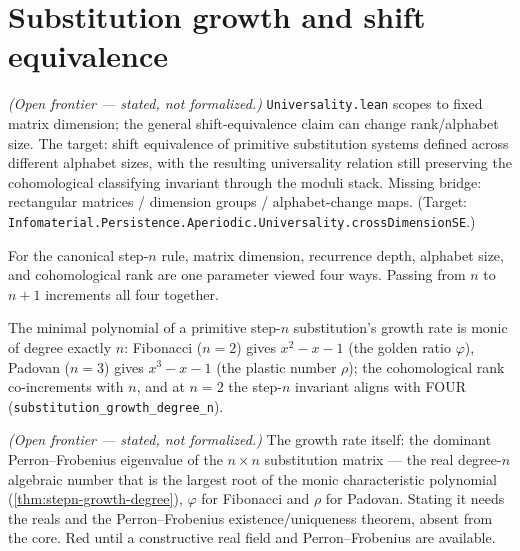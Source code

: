 \section{Substitution growth and shift equivalence}

\begin{theorem}\label{thm:cross-dimension-shift-equivalence}\notready{}
\emph{(Open frontier --- stated, not formalized.)} \texttt{Universality.lean} scopes to fixed matrix
dimension; the general shift-equivalence claim can change rank/alphabet size. The
target: shift equivalence of primitive substitution systems defined across different alphabet sizes,
with the resulting universality relation still preserving the cohomological classifying invariant
through the moduli stack. Missing bridge: rectangular matrices / dimension groups / alphabet-change
maps. (Target: \texttt{Infomaterial.Persistence.Aperiodic.Universality.crossDimensionSE}.)
\end{theorem}

\begin{theorem}\label{thm:stepn-co-increment}\leanok{}
For the canonical step-$n$ rule, matrix dimension, recurrence depth,
alphabet size, and cohomological rank are one parameter viewed four ways.
Passing from $n$ to $n+1$ increments all four together.
\end{theorem}

\begin{theorem}\label{thm:stepn-growth-degree}\leanok{}
The minimal polynomial of a primitive step-$n$ substitution's growth rate is monic of degree
exactly $n$: Fibonacci ($n=2$) gives $x^2-x-1$ (the golden ratio $\varphi$), Padovan ($n=3$) gives
$x^3-x-1$ (the plastic number $\rho$); the cohomological rank co-increments with $n$, and at $n=2$
the step-$n$ invariant aligns with FOUR (\texttt{substitution\_growth\_degree\_n}).
\end{theorem}

\begin{theorem}\label{thm:stepn-perron-growth}\notready{}
\emph{(Open frontier --- stated, not formalized.)} The growth rate itself: the dominant
Perron--Frobenius eigenvalue of the $n\times n$ substitution matrix --- the real degree-$n$
algebraic number that is the largest root of the monic characteristic polynomial
(\cref{thm:stepn-growth-degree}), $\varphi$ for Fibonacci and $\rho$ for Padovan. Stating it needs
the reals and the Perron--Frobenius existence/uniqueness theorem, absent from the core. Red until a
constructive real field and Perron--Frobenius are available.
\end{theorem}

